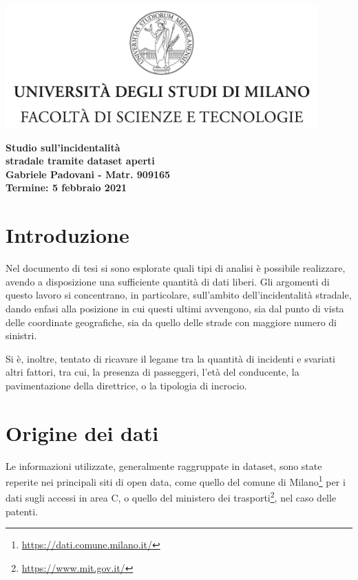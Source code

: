 \documentclass[a4paper]{article}
\begin{document}
\begin{center}
    \includegraphics[width=0.9\textwidth]{../tesi/Logo.jpg}
\end{center}
\vspace{3mm}
\begin{center}
    {\huge{\bf Studio sull'incidentalità}}\\
    \vspace{2mm}
    {\huge{\bf stradale tramite dataset aperti}}\\
    \vspace{3mm}
    {\bf Gabriele Padovani - Matr. 909165}\\
    \vspace{3mm}
    {\bf Termine: 5 febbraio 2021}\\
\end{center}

\section{Introduzione}

Nel documento di tesi si sono esplorate quali tipi di analisi è possibile realizzare, 
avendo a disposizione una sufficiente quantità di dati liberi. 
Gli argomenti di questo lavoro si concentrano, in particolare, sull'ambito dell'incidentalità 
stradale, dando enfasi alla posizione in cui questi ultimi avvengono, 
sia dal punto di vista delle coordinate geografiche, sia da quello delle strade 
con maggiore numero di sinistri. 

Si è, inoltre, tentato di ricavare il legame tra la quantità di incidenti e svariati altri 
fattori, tra cui, la presenza di passeggeri, l'età del conducente, 
la pavimentazione della direttrice, o la tipologia di incrocio.

\section{Origine dei dati}

Le informazioni utilizzate, generalmente raggruppate in dataset, sono 
state reperite nei principali siti di open data, come quello del comune di 
Milano\footnote{\url{https://dati.comune.milano.it/}} per i dati sugli accessi in area C, 
o quello del ministero dei trasporti\footnote{\url{https://www.mit.gov.it/}}, 
nel caso delle patenti.
\end{document}
